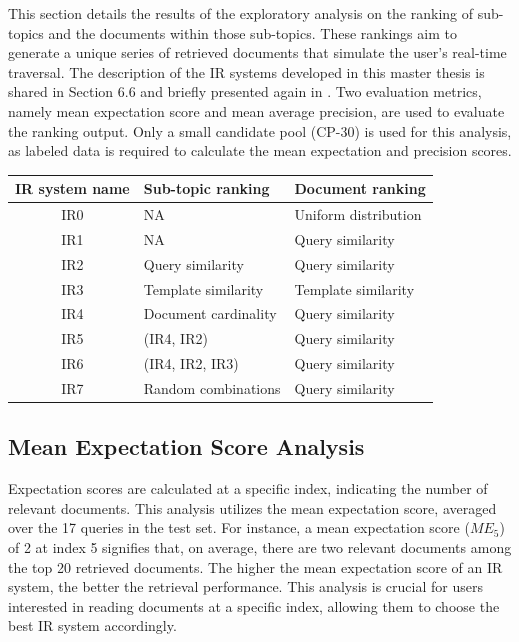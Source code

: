 This section details the results of the exploratory analysis on the ranking of sub-topics and the documents within those sub-topics. These rankings aim to generate a unique series of retrieved documents that simulate the user's real-time traversal. The description of the IR systems developed in this master thesis is shared in Section 6.6 and briefly presented again in . Two evaluation metrics, namely mean expectation score and mean average precision, are used to evaluate the ranking output. Only a small candidate pool (CP-30) is used for this analysis, as labeled data is required to calculate the mean expectation and precision scores.


\begin{center}
	\label{tab:ir_system_intro}
	\begin{tabularx}{0.8\textwidth}{|c|Y|Y|}
		\hline
		IR system name & Sub-topic ranking & Document ranking \\
		\hline
		IR0 & NA & Uniform distribution  \\
		\hline
		IR1 & NA & Query similarity \\
		\hline
		IR2 & Query similarity & Query similarity \\
		\hline
		IR3 & Template similarity & Template similarity \\
		\hline
		IR4 & Document cardinality & Query similarity \\
		\hline
		IR5 & (IR4, IR2) &  Query similarity \\
		\hline
		IR6 & (IR4, IR2, IR3) & Query similarity \\
		\hline
		IR7 & Random combinations & Query similarity  \\
		\hline
	\end{tabularx}
\end{center}

\subsection{Mean Expectation Score Analysis}

Expectation scores are calculated at a specific index, indicating the number of relevant documents. This analysis utilizes the mean expectation score, averaged over the 17 queries in the test set. For instance, a mean expectation score ($ME_5$) of 2 at index 5 signifies that, on average, there are two relevant documents among the top 20 retrieved documents. The higher the mean expectation score of an IR system, the better the retrieval performance. This analysis is crucial for users interested in reading documents at a specific index, allowing them to choose the best IR system accordingly.

